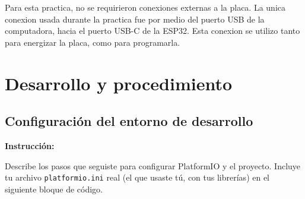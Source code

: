 \documentclass[12pt, letterpaper]{article}
\newenvironment{instruccion}{%
  \begin{mdframed}[
    backgroundcolor = tealLight,
    linecolor       = tealMain,
    linewidth       = 1pt,
    innerleftmargin = 10pt, innerrightmargin = 10pt,
    innertopmargin  = 6pt,  innerbottommargin= 6pt
  ]
  \small\color{tealMain}\textbf{Instrucción:}\hspace{4pt}\color{black}
}{%
  \end{mdframed}
}
\begin{document}

Para esta practica, no se requirieron conexiones externas a la placa. La unica conexion usada durante la practica fue por medio del puerto USB de la computadora, hacia el puerto USB-C de la ESP32. Esta conexion se utilizo tanto para energizar la placa, como para programarla.


\section{Desarrollo y procedimiento}

\subsection{Configuración del entorno de desarrollo}

\begin{instruccion}
  Describe los pasos que seguiste para configurar PlatformIO y el proyecto.
  Incluye tu archivo \texttt{platformio.ini} real (el que usaste tú, con tus
  librerías) en el siguiente bloque de código.
\end{instruccion}
\end{document}

